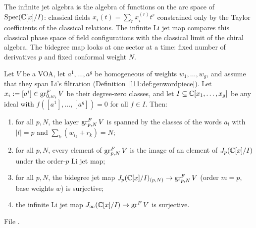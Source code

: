 \begin{physics}
The infinite jet algebra is the algebra of functions on the arc space of $\operatorname{Spec}({\mathbb{C}}[x]/I)$: classical
fields $x_i(t) = \sum_rx_i^{(r)}t^r$ constrained only by the Taylor coefficients of the classical relations. The infinite
Li jet map compares this classical phase space of field configurations with the classical limit of the chiral
algebra. The bidegree map looks at one sector at a time: fixed number of derivatives $p$ and fixed conformal weight $N$.
\end{physics}

\begin{theorem}\label{l11:thm:genwordsurj}
Let $V$ be a VOA, let $a^1,\dots,a^g$ be homogeneous of weights $w_1,\dots,w_g$, and assume that they span Li's filtration
(Definition~\ref{l11:def:genwordpiece}). Let $x_i := [a^i]\in\operatorname{gr}^F_{0,w_i}V$ be their degree-zero classes, and let
$I\subseteq{\mathbb{C}}[x_1,\dots,x_g]$ be any ideal with $f([a^1],\dots,[a^g]) = 0$ for all $f\in I$. Then:
\begin{enumerate}
\item for all $p,N$, the layer $\operatorname{gr}^F_{p,N}V$ is spanned by the classes of the words $a_l$ with $|l| = p$ and
  $\sum_k(w_{i_k}+r_k) = N$;
\item for all $p,N$, every element of $\operatorname{gr}^F_{p,N}V$ is the image of an element of $J_p({\mathbb{C}}[x]/I)$ under the
  order-$p$ Li jet map;
\item for all $p,N$, the bidegree jet map $J_p({\mathbb{C}}[x]/I)_{(p,N)}\to\operatorname{gr}^F_{p,N}V$ (order $m=p$, base weights $w$) is
  surjective;
\item the infinite Li jet map $J_\infty({\mathbb{C}}[x]/I)\to\operatorname{gr}^FV$ is surjective.
\end{enumerate}
\end{theorem}
\noindent File .
